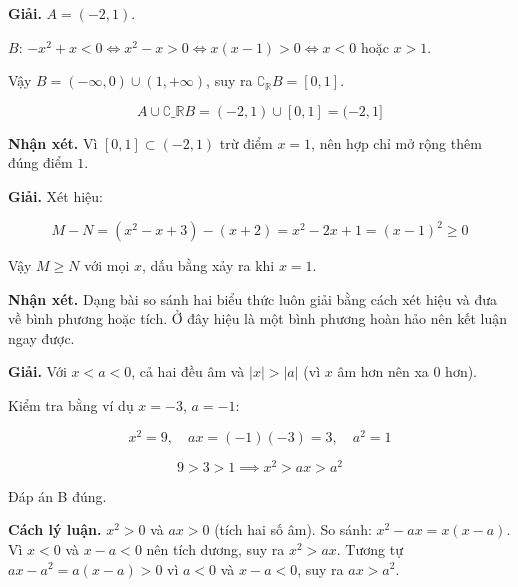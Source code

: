 \documentclass[11pt, a4paper]{article}
\begin{document}
\begin{dapan}[7 — Đáp án A]
\textbf{Giải.} $A = (-2, 1)$.

$B$: $-x^2 + x < 0 \iff x^2 - x > 0 \iff x(x-1) > 0 \iff x < 0$ hoặc $x > 1$.

Vậy $B = (-\infty, 0) \cup (1, +\infty)$, suy ra $\complement_{\mathbb{R}} B = [0, 1]$.

$$A \cup \complement\_{\mathbb{R}} B = (-2, 1) \cup [0, 1] = (-2, 1]$$

\textbf{Nhận xét.} Vì $[0,1] \subset (-2,1)$ trừ điểm $x = 1$, nên hợp chỉ mở rộng thêm đúng điểm $1$.
\end{dapan}

\begin{dapan}[8 — Đáp án C]
\textbf{Giải.} Xét hiệu:

$$M - N = (x^2 - x + 3) - (x + 2) = x^2 - 2x + 1 = (x-1)^2 \ge 0$$

Vậy $M \ge N$ với mọi $x$, dấu bằng xảy ra khi $x = 1$.

\textbf{Nhận xét.} Dạng bài so sánh hai biểu thức luôn giải bằng cách xét hiệu và đưa về bình phương hoặc tích. Ở đây hiệu là một bình phương hoàn hảo nên kết luận ngay được.
\end{dapan}

\begin{dapan}[9 — Đáp án B]
\textbf{Giải.} Với $x < a < 0$, cả hai đều âm và $|x| > |a|$ (vì $x$ âm hơn nên xa $0$ hơn).

Kiểm tra bằng ví dụ $x = -3$, $a = -1$:

$$x^2 = 9, \quad ax = (-1)(-3) = 3, \quad a^2 = 1$$

$$9 > 3 > 1 \implies x^2 > ax > a^2$$

Đáp án B đúng.

\textbf{Cách lý luận.} $x^2 > 0$ và $ax > 0$ (tích hai số âm). So sánh: $x^2 - ax = x(x-a)$. Vì $x < 0$ và $x - a < 0$ nên tích dương, suy ra $x^2 > ax$. Tương tự $ax - a^2 = a(x-a) > 0$ vì $a<0$ và $x-a<0$, suy ra $ax > a^2$.
\end{dapan}
\end{document}
